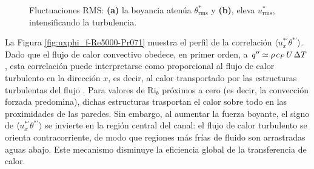 \begin{figure}[H]
  \centering
    \caption{Fluctuaciones RMS: \textbf{(a)} la boyancia atenúa $\theta^*_{\text{rms}}$ y \textbf{(b)}, eleva $u^*_{\text{rms}}$, intensificando la turbulencia.}
\end{figure}

La Figura \ref{fig:uxphi_f-Re5000-Pr071} muestra el perfil de la correlación $\langle u_x^{*'} \theta^{*'} \rangle$. Dado que el flujo de calor convectivo obedece, en primer orden, a $q'' \simeq \rho \hspace{0.5mm} c_P \hspace{0.5mm} U \hspace{0.5mm} \Delta T$, esta correlación puede interpretarse como proporcional al flujo de calor turbulento en la dirección $x$, es decir, al calor transportado por las estructuras turbulentas del flujo \cite{kundu, pope2001turbulent}. Para valores de Ri$_b$ próximos a cero (es decir, la convección forzada predomina), dichas estructuras trasportan el calor sobre todo en las proximidades de las paredes. Sin embargo, al aumentar la fuerza boyante, el signo de $\langle u_x^{*'} \theta^{*'} \rangle$ se invierte en la región central del canal: el flujo de calor turbulento se orienta contracorriente, de modo que regiones más frías de fluido son arrastradas aguas abajo. Este mecanismo disminuye la eficiencia global de la transferencia de calor.

